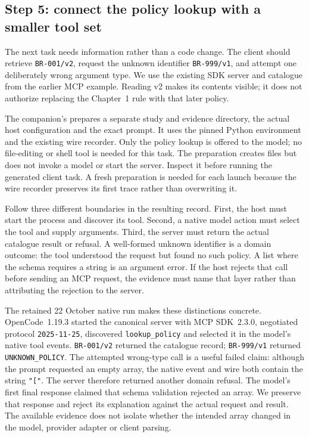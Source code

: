 \subsection*{Step 5: connect the policy lookup with a smaller tool set}

The next task needs information rather than a code change. The client should retrieve \texttt{BR-001/v2}, request the unknown identifier \texttt{BR-999/v1}, and attempt one deliberately wrong argument type. We use the existing SDK server and catalogue from the earlier MCP example. Reading v2 makes its contents visible; it does not authorize replacing the Chapter~1 rule with that later policy.

The companion's  prepares a separate study and evidence directory, the actual host configuration and the exact prompt. It uses the pinned Python environment and the existing wire recorder. Only the policy lookup is offered to the model; no file-editing or shell tool is needed for this task. The preparation creates files but does not invoke a model or start the server. Inspect it before running the generated client task. A fresh preparation is needed for each launch because the wire recorder preserves its first trace rather than overwriting it.

Follow three different boundaries in the resulting record. First, the host must start the process and discover its tool. Second, a native model action must select the tool and supply arguments. Third, the server must return the actual catalogue result or refusal. A well-formed unknown identifier is a domain outcome: the tool understood the request but found no such policy. A list where the schema requires a string is an argument error. If the host rejects that call before sending an MCP request, the evidence must name that layer rather than attributing the rejection to the server.

The retained 22 October native run makes these distinctions concrete. OpenCode~1.19.3 started the canonical server with MCP SDK~2.3.0, negotiated protocol \texttt{2025-11-25}, discovered \texttt{lookup\_policy} and selected it in the model's native tool events. \texttt{BR-001/v2} returned the catalogue record; \texttt{BR-999/v1} returned \texttt{UNKNOWN\_POLICY}. The attempted wrong-type call is a useful failed claim: although the prompt requested an empty array, the native event and wire both contain the string \texttt{"["}. The server therefore returned another domain refusal. The model's first final response claimed that schema validation rejected an array. We preserve that response and reject its explanation against the actual request and result. The available evidence does not isolate whether the intended array changed in the model, provider adapter or client parsing.

